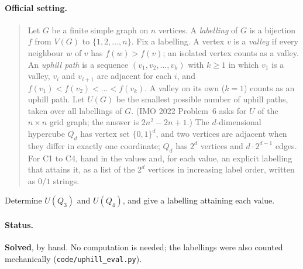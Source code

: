 
\paragraph{Official setting.}
\begin{quote}
Let $G$ be a finite simple graph on $n$ vertices. A \emph{labelling} of $G$ is a bijection $f$
from $V(G)$ to $\{1,2,\dots,n\}$. Fix a labelling. A vertex $v$ is a \emph{valley} if every
neighbour $w$ of $v$ has $f(w)>f(v)$; an isolated vertex counts as a valley. An \emph{uphill path}
is a sequence $(v_1,v_2,\dots,v_k)$ with $k\ge1$ in which $v_1$ is a valley, $v_i$ and $v_{i+1}$
are adjacent for each $i$, and $f(v_1)<f(v_2)<\dots<f(v_k)$. A valley on its own ($k=1$) counts as
an uphill path. Let $U(G)$ be the smallest possible number of uphill paths, taken over all
labellings of $G$. (IMO 2022 Problem~6 asks for $U$ of the $n\times n$ grid graph; the answer is
$2n^2-2n+1$.) The $d$-dimensional hypercube $Q_d$ has vertex set $\{0,1\}^d$, and two vertices are
adjacent when they differ in exactly one coordinate; $Q_d$ has $2^d$ vertices and $d\cdot2^{d-1}$
edges. For C1 to C4, hand in the values and, for each value, an explicit labelling that attains
it, as a list of the $2^d$ vertices in increasing label order, written as $0/1$ strings.
\end{quote}

\begin{statement}
Determine $U(Q_3)$ and $U(Q_4)$, and give a labelling attaining each value.
\end{statement}

\paragraph{Status.} \textbf{Solved}, by hand. No computation is needed; the labellings were
also counted mechanically (\texttt{code/uphill\_eval.py}).

